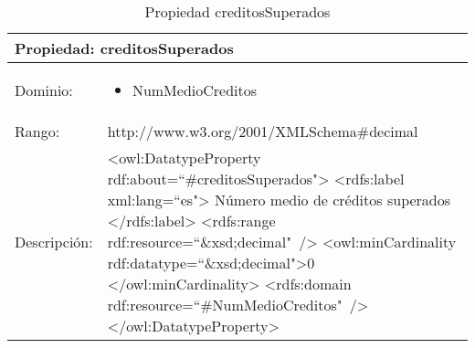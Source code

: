 \begin{table}[!ht]
	\centering
	\begin{tabular}{|p{}|p{}|}
		\hline
		\multicolumn{2}{|l|}{Propiedad: \textbf{creditosSuperados}}
		\\ \hline
		Dominio:&
		\begin{itemize}
			\item NumMedioCreditos
		\end{itemize}
		\\ \hline
		Rango:&
		http://www.w3.org/2001/XMLSchema\#decimal
		\\ \hline
		Descripción:&
		\textless owl:DatatypeProperty rdf:about=``\#creditosSuperados"\textgreater\newline 
		\tab\textless rdfs:label xml:lang=``es"\textgreater\newline
		\tab\tab Número medio de créditos superados\newline
		\tab\textless /rdfs:label\textgreater\newline
		\tab\textless rdfs:range\newline
		\tab\tab rdf:resource=``\&xsd;decimal"\ /\textgreater\newline
		\tab\textless owl:minCardinality \newline
		\tab\tab rdf:datatype=``\&xsd;decimal"\textgreater0\newline
		\tab\textless /owl:minCardinality\textgreater\newline
		\tab\textless rdfs:domain\newline
		\tab\tab rdf:resource=``\#NumMedioCreditos"\ /\textgreater\newline
		\textless /owl:DatatypeProperty\textgreater
		\\ \hline
	\end{tabular}
	\caption{Propiedad creditosSuperados}
	\label{propiedad-creditossuperados}
\end{table}

